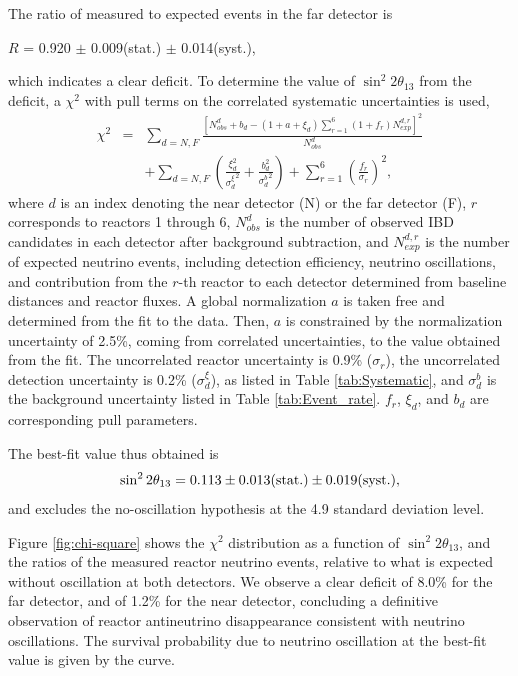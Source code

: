 \documentclass[aps,prl,twocolumn,superscriptaddress,showpacs]{revtex4-1}
\begin{document}
The ratio of measured to expected events in the far detector is
\begin{center}
$R$ = 0.920 $\pm$ 0.009(stat.) $\pm$ 0.014(syst.),
\end{center}
which indicates a clear deficit. To determine the value of $\sin^2 2\theta_{13}$ from the deficit, a $\chi^2$ with pull terms on the correlated systematic uncertainties \cite{ref_33} is used,
\begin{eqnarray}
 \chi^2  & = & \sum_{d=N, F} \frac{ \left[ N_{obs}^d + b_d
  -(1+a+\xi_d )\sum_{r=1}^{6}(1+f_r)N_{exp}^{d,r} \right]^2 } {N_{obs}^d }
 \nonumber       \\
&& + \sum_{d=N, F} \left( \frac{\xi_d^2}{{\sigma_d^{\xi}}^2} + \frac{b_d^2}{{\sigma_d^b}^2} \right) + \sum_{r=1}^{6} \left( \frac{f_r}{\sigma_r} \right)^2 ,  
\end{eqnarray}
where $d$ is an index denoting the near detector (N) or the far detector (F), $r$ corresponds to reactors 1 through 6, $N_{obs}^d$ is the number of observed IBD candidates in each detector after background subtraction, and $N_{exp}^{d, r}$ is the number of expected neutrino events, including detection efficiency, neutrino oscillations, and contribution from the $r$-th reactor to each detector determined from baseline distances and reactor fluxes. A global normalization $a$ is taken free and determined from the fit to the data. Then, $a$ is constrained by the normalization uncertainty of 2.5\%, coming from correlated uncertainties, to the value obtained from the fit. The uncorrelated reactor uncertainty is 0.9\% ($\sigma_r$), the uncorrelated detection uncertainty is 0.2\% ($\sigma_d^{\xi}$), as listed in Table \ref{tab:Systematic}, and $\sigma_d^b$ is the background uncertainty listed in Table \ref{tab:Event_rate}. $f_r$, $\xi_d$, and $b_d$ are corresponding pull parameters.

The best-fit value thus obtained is 
\begin{equation}
\sin^2 2\theta_{13} = 0.113 \pm 0.013(\rm stat.) \pm 0.019(\rm syst.),
\end{equation}
and excludes the no-oscillation hypothesis at the 4.9 standard deviation level.            

Figure \ref{fig:chi-square} shows the $\chi^2$ distribution as a function of $\sin^2 2\theta_{13}$, and the ratios of the measured reactor neutrino events, relative to what is expected without oscillation at both detectors.
We observe a clear deficit of 8.0\% for the far detector, and of 1.2\% for the near detector, concluding a definitive observation of reactor antineutrino disappearance consistent with neutrino oscillations. The survival probability due to neutrino oscillation at the best-fit value is given by the curve.
\end{document}
